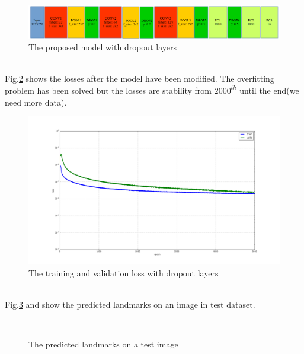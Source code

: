 \documentclass[12pt,a4paper]{article}
\begin{document}
\begin{figure}[h!]
	\centering
	\includegraphics[scale=0.35]{images/model3_dropout}
	\caption{The proposed model with dropout layers}
	\label{model2dropout}
\end{figure}~\\
Fig.\ref{tvldropout} shows the losses after the model have been modified. The overfitting problem has been solved but the losses are stability from $2000^{th}$ until the end(we need more data). 
\begin{figure}[h!]
	\centering
	\includegraphics[scale=0.17]{images/figure_1_cnn3_3000_v13_loss_change3_dropout_increase_2}
	\caption{The training and validation loss with dropout layers}
	\label{tvldropout}
\end{figure}~\\
Fig.\ref{expr22} and show the predicted landmarks on an image in test dataset. 
\begin{figure}[h!]
\centering
{}~~
\caption{The predicted landmarks on a test image}
\label{expr22}
\end{figure}~\\
\end{document}
